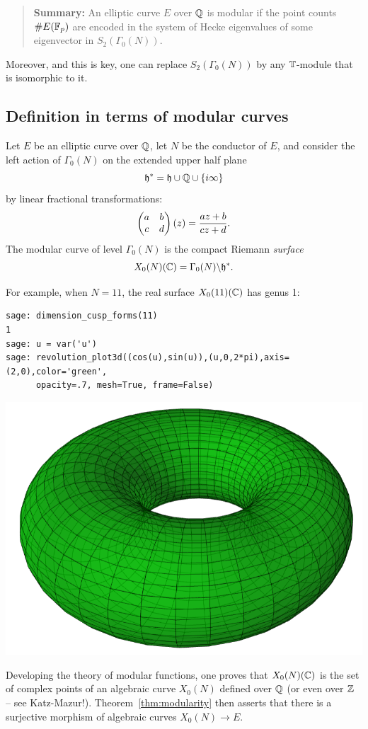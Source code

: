 \documentclass{book}
\begin{document}
\begin{quote}
{\bf Summary:} An elliptic curve $E$ over $\mathbb{Q}$ is modular if
the point counts $\# E(\mathbb{F}_p)$ are encoded in the system
of Hecke eigenvalues of some eigenvector in $S_2(\Gamma_0(N))$.
\end{quote}

  Moreover, and this is key, one can replace $S_2(\Gamma_0(N))$ by any $\mathbb{T}$-module that is isomorphic
to it.


\subsection{Definition in terms of modular curves}

Let $E$ be an elliptic curve over $\mathbb{Q}$, let $N$
be the conductor of $E$, and consider the left action
of $\Gamma_0(N)$ on the extended upper half plane
$$
\mathfrak{h}^*=\mathfrak{h}\cup\mathbb{Q}\cup\{i\infty\}
$$
by linear fractional transformations:
$$
\left( \begin{matrix}a&b\\c&d \end{matrix}\right)(z) = \frac{az+b}{cz+d}.
$$
The modular curve of level $\Gamma_0(N)$ is the compact Riemann {\em surface}
$$
  X_0(N)(\mathbb{C}) = \Gamma_0(N) \backslash \mathfrak{h}^*.
$$


For example, when $N=11$, the real surface $X_0(11)(\mathbb{C})$ has genus 1:
\begin{lstlisting}
sage: dimension_cusp_forms(11)
1
sage: u = var('u')
sage: revolution_plot3d((cos(u),sin(u)),(u,0,2*pi),axis=(2,0),color='green',
      opacity=.7, mesh=True, frame=False)
\end{lstlisting}
\begin{center}
\includegraphics[width=.7\textwidth]{pics/torus}
\end{center}


Developing the theory of modular functions, one proves that
$X_0(N)(\mathbb{C})$ is the set of complex points of an algebraic curve
$X_0(N)$ defined over $\mathbb{Q}$ (or even over $\mathbb{Z}$ -- see Katz-Mazur!).
Theorem~\ref{thm:modularity} then asserts that there is a surjective
morphism of algebraic curves $X_0(N)\to E$.
\end{document}
